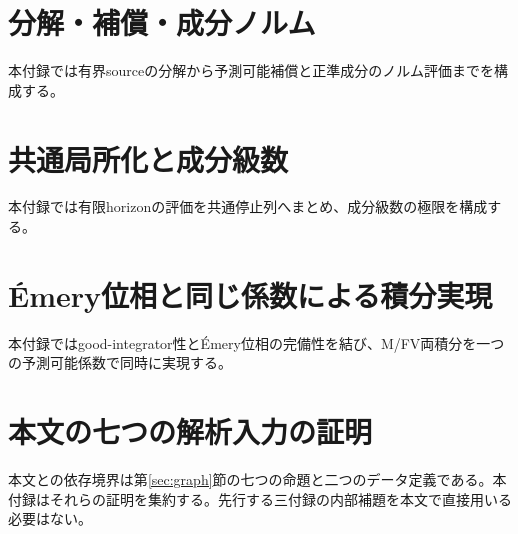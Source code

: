 \clearpage
\section{分解・補償・成分ノルム}
\label{sec:construction}
本付録では有界sourceの分解から予測可能補償と正準成分のノルム評価までを構成する。









\clearpage
\section{共通局所化と成分級数}
\label{sec:localization}
本付録では有限horizonの評価を共通停止列へまとめ、成分級数の極限を構成する。



\clearpage
\section{Émery位相と同じ係数による積分実現}
\label{sec:emery-realization}
本付録ではgood-integrator性とÉmery位相の完備性を結び、M/FV両積分を一つの予測可能係数で同時に実現する。



\clearpage
\section{本文の七つの解析入力の証明}
\label{sec:input-proofs}
本文との依存境界は第\ref{sec:graph}節の七つの命題と二つのデータ定義である。本付録はそれらの証明を集約する。先行する三付録の内部補題を本文で直接用いる必要はない。










